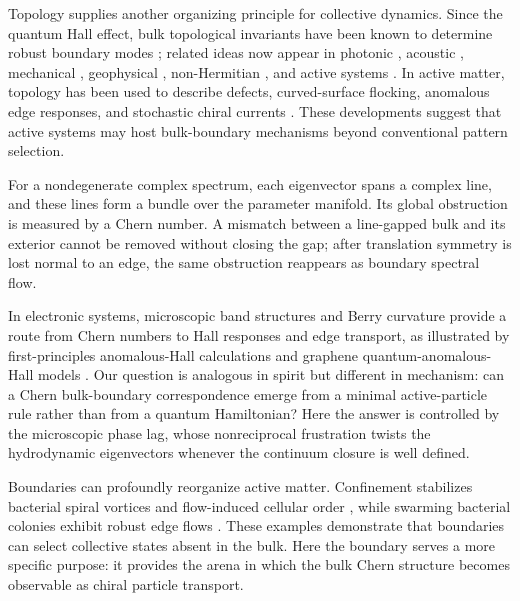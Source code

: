 \documentclass[aps,prl,reprint,superscriptaddress,nofootinbib,floatfix]{revtex4-2}
\begin{document}
Topology supplies another organizing principle for collective dynamics. Since the quantum Hall effect, bulk topological invariants have been known to determine robust boundary modes \cite{Thouless1982,Hatsugai1993}; related ideas now appear in photonic \cite{HaldaneRaghu2008,WangPhotonic2008}, acoustic \cite{YangAcoustic2015,HeAcoustic2016}, mechanical \cite{KaneLubensky2014,SusstrunkHuber2015}, geophysical \cite{Delplace2017,Tauber2019}, non-Hermitian \cite{YaoWang2018,Kunst2018}, and active systems \cite{Ashida_Anomalous_2019,Tang_Topology_2021}. In active matter, topology has been used to describe defects, curved-surface flocking, anomalous edge responses, and stochastic chiral currents \cite{Shankar_Topological_2022}. These developments suggest that active systems may host bulk-boundary mechanisms beyond conventional pattern selection.

For a nondegenerate complex spectrum, each eigenvector spans a complex line, and these lines form a bundle over the parameter manifold. Its global obstruction is measured by a Chern number. A mismatch between a line-gapped bulk and its exterior cannot be removed without closing the gap; after translation symmetry is lost normal to an edge, the same obstruction reappears as boundary spectral flow.


In electronic systems, microscopic band structures and Berry curvature provide a route from Chern numbers to Hall responses and edge transport, as illustrated by first-principles anomalous-Hall calculations and graphene quantum-anomalous-Hall models \cite{Yao2004AHE,Qiao2010QAHGraphene}. Our question is analogous in spirit but different in mechanism: can a Chern bulk-boundary correspondence emerge from a minimal active-particle rule rather than from a quantum Hamiltonian? Here the answer is controlled by the microscopic phase lag, whose nonreciprocal frustration twists the hydrodynamic eigenvectors whenever the continuum closure is well defined.

Boundaries can profoundly reorganize active matter. Confinement stabilizes bacterial spiral vortices and flow-induced cellular order \cite{Wioland2013,Lushi2014}, while swarming bacterial colonies exhibit robust edge flows \cite{Zhang2024RobustEdge}. These examples demonstrate that boundaries can select collective states absent in the bulk. Here the boundary serves a more specific purpose: it provides the arena in which the bulk Chern structure becomes observable as chiral particle transport.
\end{document}
